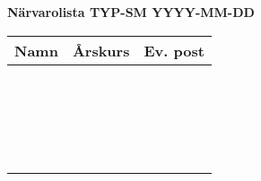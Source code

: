 \documentclass[notitlepage, oneside, 12pt]{article}
\begin{document}
\begin{center}
\noindent\huge\bf Närvarolista TYP-SM YYYY-MM-DD %
\end{center}

\addvspace{1cm}

\begin{center}
\begin{tabular}{@{}|p{}|p{}|p{}|@{}}
\hline
\Large\bf Namn & \Large\bf Årskurs & \Large\bf Ev. post \\
\hline
\rule{0pt}{1cm} & & \\
\hline
\rule{0pt}{1cm} & & \\
\hline
\rule{0pt}{1cm} & & \\
\hline
\rule{0pt}{1cm} & & \\
\hline
\rule{0pt}{1cm} & & \\
\hline
\rule{0pt}{1cm} & & \\
\hline
\rule{0pt}{1cm} & & \\
\hline
\rule{0pt}{1cm} & & \\
\hline
\rule{0pt}{1cm} & & \\
\hline
\rule{0pt}{1cm} & & \\
\hline
\rule{0pt}{1cm} & & \\
\hline
\rule{0pt}{1cm} & & \\
\hline
\rule{0pt}{1cm} & & \\
\hline
\rule{0pt}{1cm} & & \\
\hline
\rule{0pt}{1cm} & & \\
\hline
\rule{0pt}{1cm} & & \\
\hline
\rule{0pt}{1cm} & & \\
\hline
\rule{0pt}{1cm} & & \\
\hline
\rule{0pt}{1cm} & & \\
\hline
\rule{0pt}{1cm} & & \\
\hline
\end{tabular}
\end{center}
\end{document}
